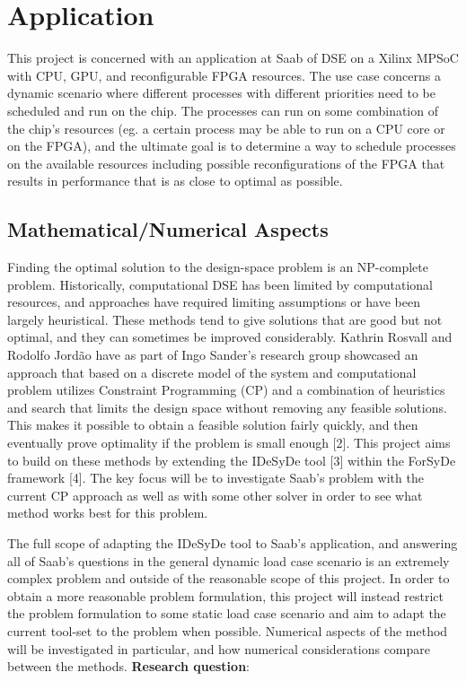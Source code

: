 \documentclass[12pt,notitlepage]{article}
\begin{document}
\section{Application}
This project is concerned with an application at Saab of DSE on a Xilinx MPSoC with CPU, GPU, and reconfigurable FPGA resources. The use case concerns a dynamic scenario where different processes with different priorities need to be scheduled and run on the chip. The processes can run on some combination of the chip's resources (eg. a certain process may be able to run on a CPU core or on the FPGA), and the ultimate goal is to determine a way to schedule processes on the available resources including possible reconfigurations of the FPGA that results in performance that is as close to optimal as possible.

\subsection{Mathematical/Numerical Aspects}
Finding the optimal solution to the design-space problem is an NP-complete problem. Historically, computational DSE has been limited by computational resources, and approaches have required limiting assumptions or have been largely heuristical. These methods tend to give solutions that are good but not optimal, and they can sometimes be improved considerably. Kathrin Rosvall and Rodolfo Jordão have as part of Ingo Sander's research group showcased an approach that based on a discrete model of the system and computational problem utilizes Constraint Programming (CP) and a combination of heuristics and search that limits the design space without removing any feasible solutions. This makes it possible to obtain a feasible solution fairly quickly, and then eventually prove optimality if the problem is small enough [2]. This project aims to build on these methods by extending the IDeSyDe tool [3] within the ForSyDe framework [4]. The key focus will be to investigate Saab's problem with the current CP approach as well as with some other solver in order to see what method works best for this problem.

The full scope of adapting the IDeSyDe tool to Saab's application, and answering all of Saab's questions in the general dynamic load case scenario is an extremely complex problem and outside of the reasonable scope of this project. In order to obtain a more reasonable problem formulation, this project will instead restrict the problem formulation to some static load case scenario and aim to adapt the current tool-set to the problem when possible. Numerical aspects of the method will be investigated in particular, and how numerical considerations compare between the methods.
\newline\newline
\noindent\textbf{Research question}:
\end{document}
